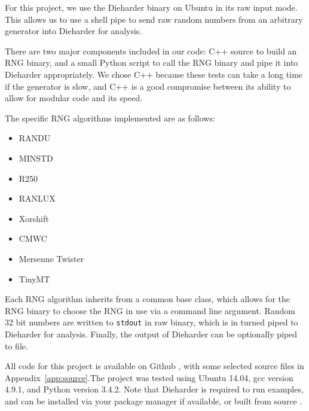 For this project, we use the Dieharder binary on Ubuntu in its raw input mode. This allows us to use a shell pipe to send raw random numbers from an arbitrary generator into Dieharder for analysis.

There are two major components included in our code: C++ source to build an RNG binary, and a small Python script to call the RNG binary and pipe it into Dieharder appropriately. We chose C++ because these tests can take a long time if the generator is slow, and C++ is a good compromise between its ability to allow for modular code and its speed.

The specific RNG algorithms implemented are as follows:
\begin{itemize}
    \item RANDU
    \item MINSTD
    \item R250
    \item RANLUX
    \item Xorshift
    \item CMWC
    \item Mersenne Twister
    \item TinyMT
\end{itemize}
Each RNG algorithm inherits from a common base class, which allows for the RNG binary to choose the RNG in use via a command line argument. Random 32 bit numbers are written to \texttt{stdout} in raw binary, which is in turned piped to Dieharder for analysis. Finally, the output of Dieharder can be optionally piped to file.

All code for this project is available on Github \cite{github_repo}, with some selected source files in Appendix~\ref{app:source}.The project was tested using Ubuntu 14.04, gcc version 4.9.1, and Python version 3.4.2. Note that Dieharder is required to run examples, and can be installed via your package manager if available, or built from source \cite{dieharder_website}.

